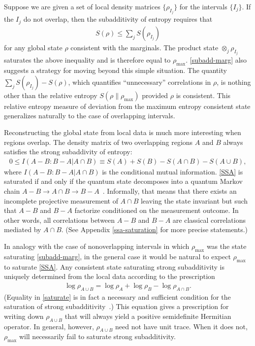 \documentclass[12pt]{article}
\def\bea{\begin{eqnarray}}
\def\eea{\end{eqnarray}}
\begin{document}
Suppose we are given a set of local density matrices $\{ \rho_{I_j} \}$ for the intervals $\{ I_j \}$. If the $I_j$ do not overlap, then the subadditivity of entropy requires that
\bea \label{subadd-marg}
S(\rho)\leq \sum_j S(\rho_{I_j})
\eea
for any global state $\rho$ consistent with the marginals.
The product state $\otimes_j \rho_{I_j}$ saturates the above inequality and is therefore equal to $\rho_{\max}$. \eqref{subadd-marg} also suggests a strategy for moving beyond this simple situation. The quantity $\sum_j S(\rho_{I_j}) - S(\rho)$, which quantifies ``unnecessary'' correlations in $\rho$, is nothing other than the relative entropy $S(\rho \| \rho_{\max} )$ provided $\rho$ is consistent. This relative entropy measure of deviation from the maximum entropy consistent state generalizes naturally to the case of overlapping intervals.


Reconstructing the global state from local data is much more interesting when regions overlap. The density matrix of two overlapping regions $A$ and $B$ always satisfies the strong subaddivity of entropy:
\bea\label{SSA}
0\leq I(A -B : B - A|A\cap B)\equiv S(A)+S(B)-S(A\cap B)-S(A\cup B),
\eea
where $I(A-B:B-A|A\cap B)$ is the conditional mutual information. \eqref{SSA} is saturated if and only if the quantum state decomposes into a quantum Markov chain $A-B \rightarrow A \cap B \rightarrow B - A$~\cite{hayden2004structure,fawzi2014quantum}. Informally, that means that there exists an incomplete projective measurement of $A \cap B$ leaving the state invariant but such that $A - B$ and $B-A$ factorize conditioned on the measurement outcome.  In other words, all correlations between $A-B$ and $B-A$ are classical correlations mediated by $A\cap B$.
(See Appendix \ref{ssa-saturation} for more precise statements.)

In analogy with the case of nonoverlapping intervals in which $\rho_{\max}$ was the state saturating \eqref{subadd-marg}, in the general case it would be natural to expect $\rho_{\max}$ to saturate \eqref{SSA}. Any consistent state saturating strong subadditivity is uniquely determined from the local data according to the prescription
 \bea\label{saturate}
 \log \rho_{A\cup B}=\log \rho_A+\log \rho_B-\log \rho_{A\cap B}.
 \eea
(Equality in \eqref{saturate} is in fact a necessary and sufficient condition for the saturation of strong subadditivity~\cite{ruskai}.) This equation gives a prescription for writing down $\rho_{A \cup B}$ that will always yield a positive semidefinite Hermitian operator. In general, however, $\rho_{A \cup B}$ need not have unit trace. When it does not, $\rho_{\max}$ will necessarily fail to saturate strong subadditivity.
\end{document}
